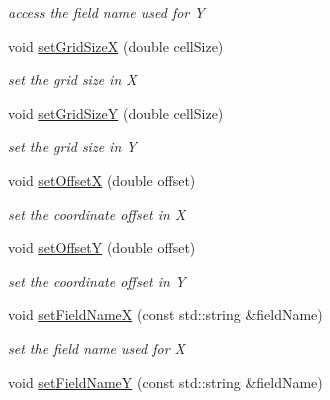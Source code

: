 \begin{DoxyCompactItemize}
\begin{DoxyCompactList}\small\item\em access the field name used for Y \item\end{DoxyCompactList}\item 
void \hyperlink{class_d_d4hep_1_1_d_d_segmentation_1_1_cartesian_grid_x_y_af4955b8d0693a3ded3a6d14defec4c9e}{setGridSizeX} (double cellSize)
\begin{DoxyCompactList}\small\item\em set the grid size in X \item\end{DoxyCompactList}\item 
void \hyperlink{class_d_d4hep_1_1_d_d_segmentation_1_1_cartesian_grid_x_y_ab824e8c12fa4314119994f7f54e134cf}{setGridSizeY} (double cellSize)
\begin{DoxyCompactList}\small\item\em set the grid size in Y \item\end{DoxyCompactList}\item 
void \hyperlink{class_d_d4hep_1_1_d_d_segmentation_1_1_cartesian_grid_x_y_acc939312a216a3182eba69a024049663}{setOffsetX} (double offset)
\begin{DoxyCompactList}\small\item\em set the coordinate offset in X \item\end{DoxyCompactList}\item 
void \hyperlink{class_d_d4hep_1_1_d_d_segmentation_1_1_cartesian_grid_x_y_a0ce3cf2155283c1b45906709b37b07fc}{setOffsetY} (double offset)
\begin{DoxyCompactList}\small\item\em set the coordinate offset in Y \item\end{DoxyCompactList}\item 
void \hyperlink{class_d_d4hep_1_1_d_d_segmentation_1_1_cartesian_grid_x_y_a2f4cb5d0e804e2489ae2916c9eb3503d}{setFieldNameX} (const std::string \&fieldName)
\begin{DoxyCompactList}\small\item\em set the field name used for X \item\end{DoxyCompactList}\item 
void \hyperlink{class_d_d4hep_1_1_d_d_segmentation_1_1_cartesian_grid_x_y_a291b68b5ed0be43c141665b38aeeab52}{setFieldNameY} (const std::string \&fieldName)

\end{DoxyCompactItemize}
